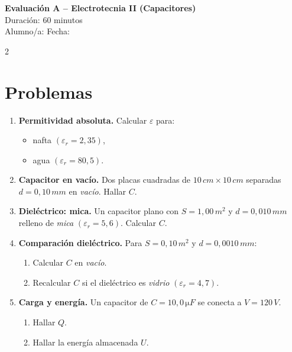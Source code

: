 \documentclass[a4paper,10pt]{article}
\begin{document}
\begin{center}
    \Large \textbf{Evaluación A – Electrotecnia II (Capacitores)} \\
    \normalsize Duración: 60 minutos \\
    Alumno/a: \underline{\hspace{6cm}} \hspace{0.5cm} Fecha: \underline{\hspace{2cm}}
\end{center}

\vspace{0.3cm}


\vspace{0.2cm}

\begin{multicols}{2}

\section*{Problemas}

\begin{enumerate}
\item \textbf{Permitividad absoluta.} Calcular \(\varepsilon\) para:
\begin{itemize}
\item nafta \(\left(\varepsilon_r=2{,}35\right)\),
\item agua \(\left(\varepsilon_r=80{,}5\right)\).
\end{itemize}

\item \textbf{Capacitor en vacío.} Dos placas cuadradas de \(10\,\si{cm}\times 10\,\si{cm}\) separadas \(d=0{,}10\,\si{mm}\) en \textit{vacío}. Hallar \(C\).

\item \textbf{Dieléctrico: mica.} Un capacitor plano con \(S=1{,}00\,\si{m^2}\) y \(d=0{,}010\,\si{mm}\) relleno de \textit{mica} \(\left(\varepsilon_r=5{,}6\right)\). Calcular \(C\).

\item \textbf{Comparación dieléctrico.} Para \(S=0{,}10\,\si{m^2}\) y \(d=0{,}0010\,\si{mm}\):
\begin{enumerate}
\item Calcular \(C\) en \textit{vacío}.
\item Recalcular \(C\) si el dieléctrico es \textit{vidrio} \(\left(\varepsilon_r=4{,}7\right)\).
\end{enumerate}

\item \textbf{Carga y energía.} Un capacitor de \(C=10{,}0\,\si{\micro F}\) se conecta a \(V=120\,\si{V}\).
\begin{enumerate}
\item Hallar \(Q\).
\item Hallar la energía almacenada \(U\).
\end{enumerate}


\end{enumerate}
\end{multicols}
\end{document}
